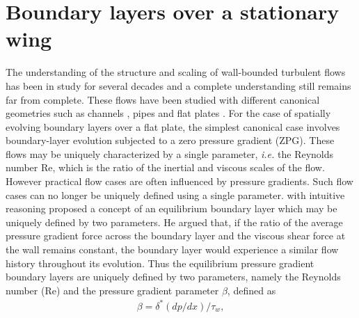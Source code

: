 
\section{Boundary layers over a stationary wing}

The understanding of the structure and scaling of wall-bounded turbulent flows has been in study for several decades and a complete understanding still remains far from complete. These flows have been studied with different canonical geometries such as channels \citep{kim87,moser99,lee15}, pipes \citep{elkhoury13,jimenez08,chin15} and flat plates \cite{spalart88,schlatter10,eitel14}. For the case of spatially evolving boundary layers over a flat plate, the simplest canonical case involves boundary-layer evolution subjected to a zero pressure gradient (ZPG). These flows may be uniquely characterized by a single parameter, \textit{i.e.} the Reynolds number Re, which is the ratio of the inertial and viscous scales of the flow. However practical flow cases are often influenced by pressure gradients. Such flow cases can no longer be uniquely defined using a single parameter. \cite{clauser54} with intuitive reasoning proposed a concept of an equilibrium boundary layer which may be uniquely defined by two parameters. He argued that, if the ratio of the average pressure gradient force across the boundary layer and the viscous shear force at the wall remains constant, the boundary layer would experience a similar flow history throughout its evolution. Thus the equilibrium pressure gradient boundary layers are uniquely defined by two parameters, namely the Reynolds number (Re) and the pressure gradient parameter $\beta$, defined as
\begin{eqnarray}
	\beta = \delta^{*}(dp/dx)/\tau_{w},
\end{eqnarray}
